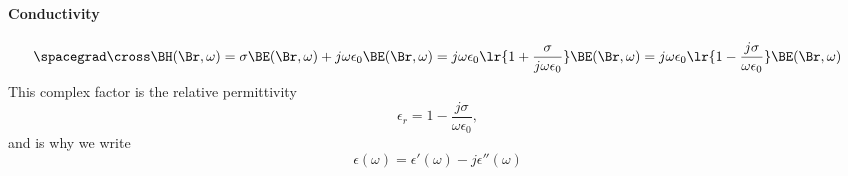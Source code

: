 \paragraph{Conductivity}
%
%
\begin{dmath}\label{eqn:druid:260}
\spacegrad \cross \BH(\Br, \omega)
= \sigma \BE(\Br, \omega) + j \omega \epsilon_0 \BE(\Br, \omega)
= j \omega \epsilon_0 \lr{ 1 + \frac{\sigma}{j \omega \epsilon_0} } \BE(\Br, \omega)
= j \omega \epsilon_0 \lr{ 1 - \frac{j \sigma}{\omega \epsilon_0} } \BE(\Br, \omega)
\end{dmath}
%
This complex factor is the relative permittivity
%
\begin{dmath}\label{eqn:druid:280}
\epsilon_r
= 1 - \frac{j \sigma}{\omega \epsilon_0},
\end{dmath}
%
and is why we write
%
\begin{dmath}\label{eqn:druid:300}
\epsilon(\omega) = \epsilon'(\omega) - j \epsilon''(\omega)
\end{dmath}
%
